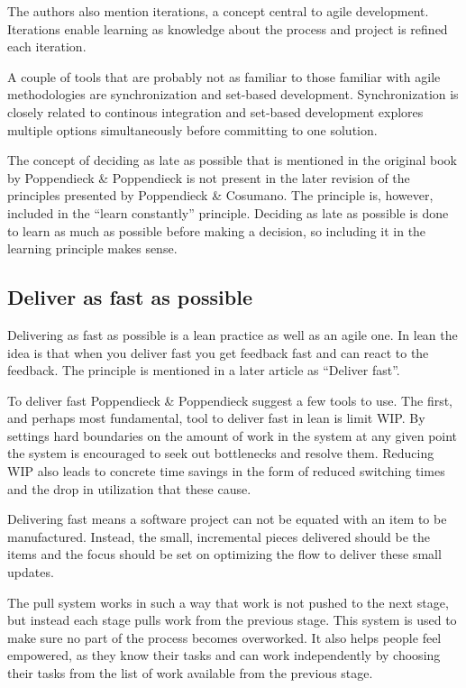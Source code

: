 The authors also mention iterations, a concept central to agile development. Iterations enable learning as knowledge about the process and project is refined each iteration. \cite{poppendieck2003lean}

A couple of tools that are probably not as familiar to those familiar with agile methodologies are synchronization and set-based development. Synchronization is closely related to continous integration and set-based development explores multiple options simultaneously before committing to one solution.\cite{poppendieck2003lean}

The concept of deciding as late as possible that is mentioned in the original book by Poppendieck \& Poppendieck is not present in the later revision of the principles presented by Poppendieck \& Cosumano. The principle is, however, included in the ``learn constantly'' principle. Deciding as late as possible is done to learn as much as possible before making a decision, so including it in the learning principle makes sense.


\subsection{Deliver as fast as possible}

Delivering as fast as possible is a lean practice as well as an agile one. In lean the idea is that when you deliver fast you get feedback fast and can react to the feedback.\cite{poppendieck2003lean} The principle is mentioned in a later article as ``Deliver fast''.\cite{Poppendieck2012Lean} 

To deliver fast Poppendieck \& Poppendieck suggest a few tools to use. The first, and perhaps most fundamental, tool to deliver fast in lean is limit WIP. By settings hard boundaries on the amount of work in the system at any given point the system is encouraged to seek out bottlenecks and resolve them. Reducing WIP also leads to concrete time savings in the form of reduced switching times and the drop in utilization that these cause.\cite{poppendieck2003lean}

Delivering fast means a software project can not be equated with an item to be manufactured. Instead, the small, incremental pieces delivered should be the items and the focus should be set on optimizing the flow to deliver these small updates.\cite{Poppendieck2012Lean}

The pull system works in such a way that work is not pushed to the next stage, but instead each stage pulls work from the previous stage. This system is used to make sure no part of the process becomes overworked. It also helps people feel empowered, as they know their tasks and can work independently by choosing their tasks from the list of work available from the previous stage.\cite{poppendieck2003lean}

